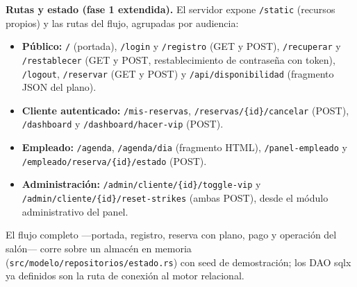 \documentclass[12pt]{article}
\begin{document}
\noindent\textbf{Rutas y estado (fase 1 extendida).} El servidor expone \texttt{/static} (recursos propios) y las rutas del flujo, agrupadas por audiencia:
\begin{itemize}
  \item \textbf{Público:} \texttt{/} (portada), \texttt{/login} y \texttt{/registro} (GET y POST), \texttt{/recuperar} y \texttt{/restablecer} (GET y POST, restablecimiento de contrase{\~n}a con token), \texttt{/logout}, \texttt{/reservar} (GET y POST) y \texttt{/api/disponibilidad} (fragmento JSON del plano).
  \item \textbf{Cliente autenticado:} \texttt{/mis-reservas}, \texttt{/reservas/\allowbreak\{id\}/\allowbreak cancelar} (POST), \texttt{/dashboard} y \texttt{/dashboard/\allowbreak hacer-vip} (POST).
  \item \textbf{Empleado:} \texttt{/agenda}, \texttt{/agenda/dia} (fragmento HTML), \texttt{/panel-empleado} y \texttt{/empleado/\allowbreak reserva/\allowbreak\{id\}/\allowbreak estado} (POST).
  \item \textbf{Administración:} \texttt{/admin/\allowbreak cliente/\allowbreak\{id\}/\allowbreak toggle-vip} y \texttt{/admin/\allowbreak cliente/\allowbreak\{id\}/\allowbreak reset-strikes} (ambas POST), desde el módulo administrativo del panel.
\end{itemize}
El flujo completo ---portada, registro, reserva con plano, pago y operación del salón--- corre sobre un almacén en memoria (\texttt{src/modelo/repositorios/estado.rs}) con seed de demostración; los DAO sqlx ya definidos son la ruta de conexión al motor relacional.
\end{document}
